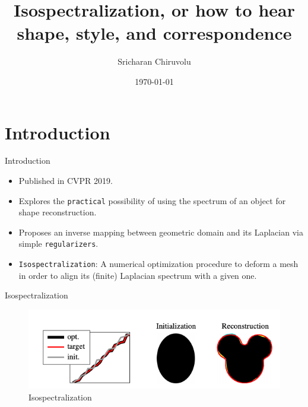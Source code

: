 \documentclass{beamer}
\title[Isospectralization]{Isospectralization, or how to hear shape, style, and correspondence}
\author{Sricharan Chiruvolu}
\institute{Zorah Lähner}
\date{\today}
\begin{document}
\begin{frame}
  \titlepage
\end{frame}





\section{Introduction}

\begin{frame}{Introduction}

\begin{itemize}
  \item Published in CVPR 2019.
  \item Explores the \texttt{practical} possibility of using the spectrum of an object for shape reconstruction.
  \item Proposes an inverse mapping between geometric domain and its Laplacian via simple \texttt{regularizers}.
  \item \texttt{Isospectralization}: A numerical optimization procedure to deform a mesh in order to align its (finite) Laplacian spectrum with a given one.
\end{itemize}

\end{frame}

\begin{frame}{Isospectralization}

\begin{figure}
    \centering
    \includegraphics[height=0.2\textwidth]{Spectral.png}
    \caption{Isospectralization}
    \label{fig:Isospectralization}
\end{figure}


\end{frame}
\end{document}
